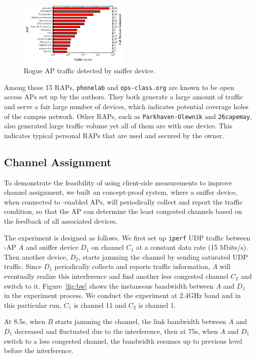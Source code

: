 \begin{figure}[t!]
  \centering
  \includegraphics[width=0.48\textwidth]{./figures/RAPTrafficGraph.pdf}
  \caption{Rogue AP traffic detected by sniffer device.}
  \label{fig:rap}
\end{figure}

Among these 15 RAPs, \texttt{phonelab} and \texttt{ops-class.org} are known to
be open access APs set up by the authors.  They both generate a large amount of
traffic and serve a fair large number of devices, which indicates potential
coverage holes of the campus network. Other RAPs, such as
\texttt{Parkhaven-Olewnik} and \texttt{26capemay}, also generated large traffic
volume yet all of them are with one device. This indicates typical personal RAPs
that are used and secured by the owner.


\subsection{Channel Assignment}

To demonstrate the feasibility of using client-side measurements to improve
channel assignment, we built an concept-proof system, where a sniffer device,
when connected to \PS{}-enabled APs, will periodically collect
and report the traffic condition, so that the AP can determine the least
congested channels based on the feedback of all associated devices. 

The experiment is designed as follows. We first set up \texttt{iperf} UDP
traffic between \PS{}-AP $A$ and sniffer device $D_1$ on channel $C_1$ at a
constant data rate (15 Mbits/s). Then another device, $D_2$, starts jamming the
channel by sending saturated UDP traffic. Since $D_1$ periodically collects and
reports traffic information, $A$ will eventually realize this interference and
find another less congested channel $C_2$ and switch to it. Figure~\ref{fig:bw}
shows the instaneous bandwidth between $A$ and $D_1$ in the experiment process.
We conduct the experiment at 2.4GHz band and in this particular run, $C_1$ is
channel 11 and $C_2$ is channel 1.

At 8.5s, when $B$ starts jamming the channel, the link bandwidth between $A$ and
$D_1$ decreased and fluctuated due to the interference, then at 75s, when $A$
and $D_1$ switch to a less congested channel, the bandwidth resumes up to
previous level before the interference.

